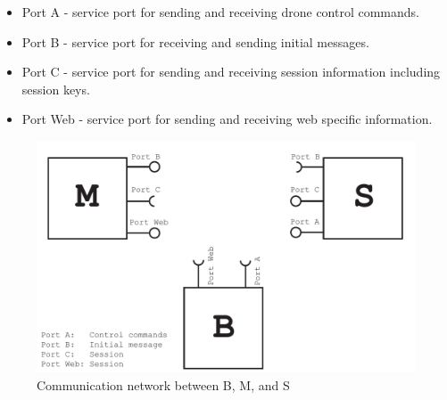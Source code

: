 \begin{itemize}
	\item Port A - service port for sending and receiving drone control commands.
	\item Port B - service port for receiving and sending initial messages.
	\item Port C - service port for sending and receiving session information including session keys.
	\item Port Web - service port for sending and receiving web specific information.
\end{itemize}

\begin{figure}[!h]
    \centering 
    \includegraphics[width=\textwidth]{gfx/communication_network.pdf}
    \caption{Communication network between B, M, and S}
    \label{fig:communication_network}
\end{figure}


